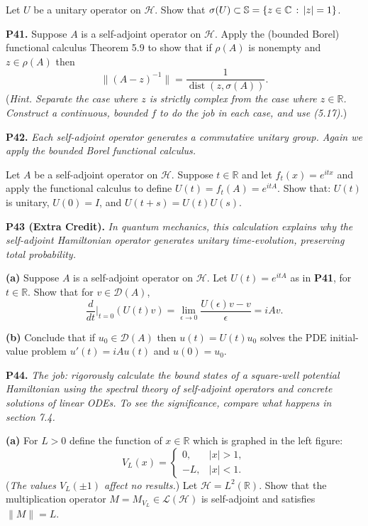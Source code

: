 \documentclass[12pt]{amsart}
\newcommand{\cD}{\mathcal{D}}
\newcommand{\cH}{\mathcal{H}}
\newcommand{\cL}{\mathcal{L}}
\newcommand{\CC}{\mathbb{C}}
\newcommand{\RR}{\mathbb{R}}
\newcommand{\eps}{\epsilon}
\newcommand{\prob}[1]{\bigskip\noindent\textbf{#1.}\quad }
\newcommand{\epart}[1]{\medskip\noindent\textbf{(#1)}\quad }
\begin{document}
\medskip\noindent Let $U$ be a unitary operator on $\cH$.  Show that $\sigma(U) \subset \SS = \{z\in\CC\,:\,|z|=1\}$.


\prob{P41}  Suppose $A$ is a self-adjoint operator on $\cH$.  Apply the (bounded Borel) functional calculus Theorem 5.9 to show that if $\rho(A)$ is nonempty and $z\in\rho(A)$ then
	$$\|(A-z)^{-1}\| = \frac{1}{\operatorname{dist}(z,\sigma(A))}.$$
(\emph{Hint. Separate the case where $z$ is strictly complex from the case where $z\in\RR$.  Construct a continuous, bounded $f$ to do the job in each case, and use (5.17).})


\clearpage\newpage
\prob{P42}  \emph{Each self-adjoint operator generates a commutative unitary group.  Again we apply the bounded Borel functional calculus.}

\medskip\noindent Let $A$ be a self-adjoint operator on $\cH$.  Suppose $t\in\RR$ and let $f_t(x) = e^{itx}$ and apply the functional calculus to define $U(t) = f_t(A) = e^{itA}$.  Show that: $U(t)$ is unitary, $U(0) = I$, and $U(t+s) = U(t) U(s)$.


\prob{P43 (Extra Credit)}  \emph{In quantum mechanics, this calculation explains why the self-adjoint Hamiltonian operator generates unitary time-evolution, preserving total probability.}

\epart{a}  Suppose $A$ is a self-adjoint operator on $\cH$.  Let $U(t) = e^{itA}$ as in \textbf{P41}, for $t\in\RR$.  Show that for $v\in\cD(A)$,
	$$\frac{d}{dt}\Big|_{t=0} (U(t)v) = \lim_{\eps\to 0} \frac{U(\eps)v-v}{\eps} = i A v.$$

\epart{b}  Conclude that if $u_0\in\cD(A)$ then $u(t) = U(t) u_0$ solves the PDE initial-value problem $u'(t) = iAu(t)$ and $u(0)=u_0$.


\prob{P44}  \emph{The job: rigorously calculate the bound states of a square-well potential Hamiltonian using the spectral theory of self-adjoint operators and concrete solutions of linear ODEs.  To see the significance, compare what happens in section 7.4.}

\epart{a}  For $L>0$ define the function of $x\in\RR$ which is graphed in the left figure:
	$$V_L(x) = \begin{cases} 0, & |x|>1, \\ -L, & |x|<1. \end{cases}$$
(\emph{The values $V_L(\pm 1)$ affect no results.})  Let $\cH=L^2(\RR)$.  Show that the multiplication operator $M = M_{V_L}\in\cL(\cH)$ is self-adjoint and satisfies $\|M\|=L$.
\end{document}
